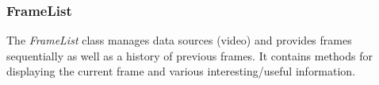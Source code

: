 \subsubsection{FrameList}
The \emph{FrameList} class manages data sources (video) and provides frames sequentially as well as a history of previous frames. It contains methods for displaying the current frame and various interesting/useful information.




